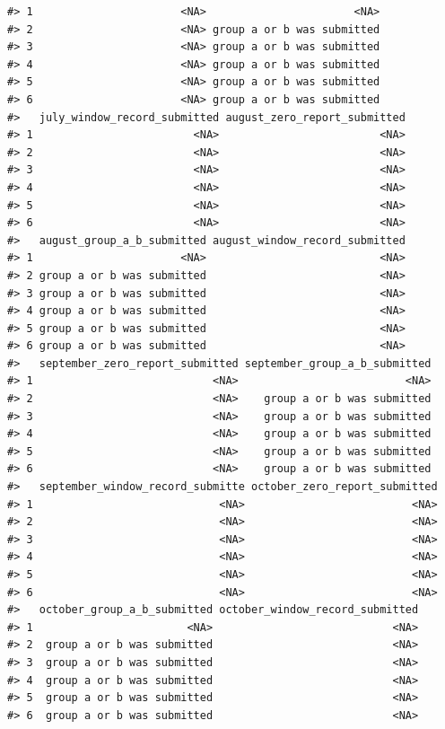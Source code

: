 \documentclass[
]{krantz}
\begin{document}
\begin{verbatim}
#> 1                       <NA>                       <NA>
#> 2                       <NA> group a or b was submitted
#> 3                       <NA> group a or b was submitted
#> 4                       <NA> group a or b was submitted
#> 5                       <NA> group a or b was submitted
#> 6                       <NA> group a or b was submitted
#>   july_window_record_submitted august_zero_report_submitted
#> 1                         <NA>                         <NA>
#> 2                         <NA>                         <NA>
#> 3                         <NA>                         <NA>
#> 4                         <NA>                         <NA>
#> 5                         <NA>                         <NA>
#> 6                         <NA>                         <NA>
#>   august_group_a_b_submitted august_window_record_submitted
#> 1                       <NA>                           <NA>
#> 2 group a or b was submitted                           <NA>
#> 3 group a or b was submitted                           <NA>
#> 4 group a or b was submitted                           <NA>
#> 5 group a or b was submitted                           <NA>
#> 6 group a or b was submitted                           <NA>
#>   september_zero_report_submitted september_group_a_b_submitted
#> 1                            <NA>                          <NA>
#> 2                            <NA>    group a or b was submitted
#> 3                            <NA>    group a or b was submitted
#> 4                            <NA>    group a or b was submitted
#> 5                            <NA>    group a or b was submitted
#> 6                            <NA>    group a or b was submitted
#>   september_window_record_submitte october_zero_report_submitted
#> 1                             <NA>                          <NA>
#> 2                             <NA>                          <NA>
#> 3                             <NA>                          <NA>
#> 4                             <NA>                          <NA>
#> 5                             <NA>                          <NA>
#> 6                             <NA>                          <NA>
#>   october_group_a_b_submitted october_window_record_submitted
#> 1                        <NA>                            <NA>
#> 2  group a or b was submitted                            <NA>
#> 3  group a or b was submitted                            <NA>
#> 4  group a or b was submitted                            <NA>
#> 5  group a or b was submitted                            <NA>
#> 6  group a or b was submitted                            <NA>

\end{verbatim}
\end{document}

